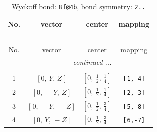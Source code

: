 \documentclass[fleqn,8pt]{jsarticle}
\begin{document}
\renewcommand{\arraystretch}{1.2}
\begin{longtable}{cccc}
\caption{Wyckoff bond: {\tt 8f@4b}, bond symmetry: {\tt 2..}}
 \\
 \hline \hline
No. & vector & center & mapping \\ \hline \endfirsthead

\multicolumn{3}{l}{\tablename\ \thetable{}} \\
 \hline \hline
No. & vector & center & mapping \\ \hline \endhead

 \hline \hline
\multicolumn{3}{r}{\footnotesize\it continued ...} \\ \endfoot

 \hline \hline
\multicolumn{3}{r}{} \\ \endlastfoot

1 & $\left[ 0,\, Y,\, Z \right]$ & $\left[ 0,\, \frac{1}{2},\, \frac{1}{4} \right]$ & {\tt [1,-4]} \\ \hline
2 & $\left[ 0,\, - Y,\, Z \right]$ & $\left[ 0,\, \frac{1}{2},\, \frac{1}{4} \right]$ & {\tt [2,-3]} \\ \hline
3 & $\left[ 0,\, - Y,\, - Z \right]$ & $\left[ 0,\, \frac{1}{2},\, \frac{3}{4} \right]$ & {\tt [5,-8]} \\ \hline
4 & $\left[ 0,\, Y,\, - Z \right]$ & $\left[ 0,\, \frac{1}{2},\, \frac{3}{4} \right]$ & {\tt [6,-7]} \\
\end{longtable}
\renewcommand{\arraystretch}{1.2}
\end{document}
